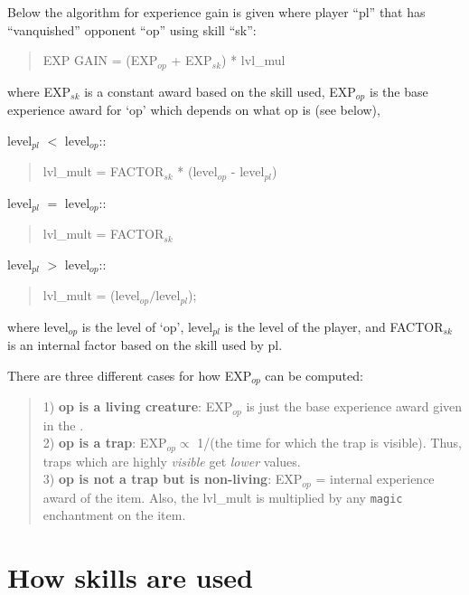 Below the algorithm for experience gain is given where player ``pl''
that has ``vanquished'' opponent ``op'' using skill ``sk'':
\begin{quote}
EXP GAIN = (EXP$_{op}$ + EXP$_{sk}$) * lvl\_mul
\end{quote}
where EXP$_{sk}$ is a constant award based on the skill used,
EXP$_{op}$ is the base experience award for `op' which depends
on what op is (see below),

 level$_{pl}$ $<$ level$_{op}$::
\begin{quote}
lvl\_mult = FACTOR$_{sk}$ * (level$_{op}$ - level$_{pl}$)
\end{quote}
 level$_{pl}$ $=$ level$_{op}$::
\begin{quote}
lvl\_mult = FACTOR$_{sk}$
\end{quote}
 level$_{pl}$ $>$ level$_{op}$::
\begin{quote}
lvl\_mult = (level$_{op}/$level$_{pl}$);
\end{quote}
where level$_{op}$ is the level of `op', level$_{pl}$ is the level
of the player, and FACTOR$_{sk}$ is an internal factor based on
the skill used by pl.

There are three different cases for how EXP$_{op}$ can be computed:
\begin{quote}
1) {\bf op is a living creature}: EXP$_{op}$ is just the base
experience award given in the \spoiler . \\

2) {\bf op is a trap}: EXP$_{op} \propto$ 1/(the time for which the
trap is visible). Thus, traps which are highly {\em visible} get {\em lower}
values. \\

3) {\bf op is not a trap but is non-living}: EXP$_{op}$ = internal
experience award of the item. Also, the lvl\_mult is multiplied by
any {\tt magic} enchantment on the item.
\end{quote}

\section{How skills are used}

